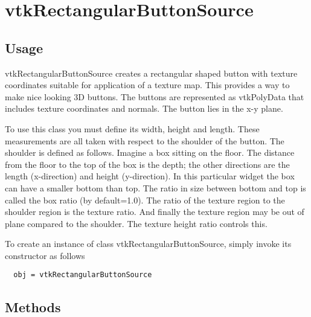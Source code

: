 \section{vtkRectangularButtonSource}

\subsection{Usage}

 vtkRectangularButtonSource creates a rectangular shaped button with
 texture coordinates suitable for application of a texture map. This
 provides a way to make nice looking 3D buttons. The buttons are 
 represented as vtkPolyData that includes texture coordinates and
 normals. The button lies in the x-y plane.

 To use this class you must define its width, height and length. These
 measurements are all taken with respect to the shoulder of the button.
 The shoulder is defined as follows. Imagine a box sitting on the floor.
 The distance from the floor to the top of the box is the depth; the other
 directions are the length (x-direction) and height (y-direction). In
 this particular widget the box can have a smaller bottom than top. The
 ratio in size between bottom and top is called the box ratio (by 
 default=1.0). The ratio of the texture region to the shoulder region
 is the texture ratio. And finally the texture region may be out of plane
 compared to the shoulder. The texture height ratio controls this.

To create an instance of class vtkRectangularButtonSource, simply
invoke its constructor as follows
\begin{verbatim}
  obj = vtkRectangularButtonSource
\end{verbatim}
\subsection{Methods}

